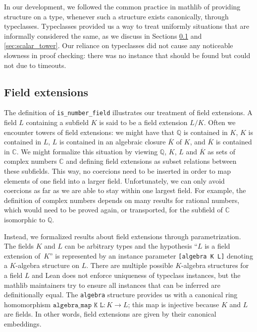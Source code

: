 \documentclass[sn-mathphys]{sn-jnl}%
\renewcommand{\C}{\mathbb{C}}
\newcommand{\lean}[1]{\texttt{#1}\xspace}
\newcommand{\mathlib}{\textsf{mathlib}\xspace}
\newcommand{\QQ}{\mathbb{Q}}
\begin{document}
In our development, we followed the common practice in \mathlib of providing structure on a type,
whenever such a structure exists canonically, through typeclasses.
Typeclasses provided us a way to treat uniformly situations that are informally considered the same, as we discuss in Sections \ref{sec:field_extension} and \ref{sec:scalar_tower}.
Our reliance on typeclasses did not cause any noticeable slowness in proof checking:
there was no instance that should be found but could not due to timeouts.

\subsection{Field extensions} \label{sec:field_extension}

The definition of \lean{is\_number\_field} illustrates our treatment of field extensions.
A field $L$ containing a subfield $K$ is said to be a field extension $L / K$.
Often we encounter towers of field extensions: we might have that $\QQ$ is contained in $K$, $K$ is contained in $L$, $L$ is contained in an algebraic closure $\overline{K}$ of $K$, and $\overline{K}$ is contained in $\C$.
We might formalize this situation by viewing $\QQ$, $K$, $L$ and $\overline{K}$ as sets of complex numbers $\C$ and defining field extensions as subset relations between these subfields.
This way, no coercions need to be inserted in order to map elements of one field into a larger field.
Unfortunately, we can only avoid coercions as far as we are able to stay within one largest field.
For example, the definition of complex numbers depends on many results for rational numbers, which would need to be proved again, or transported, for the subfield of $\C$ isomorphic to $\QQ$.

Instead, we formalized results about field extensions through parametrization. The fields $K$ and $L$ can be arbitrary types
and the hypothesis ``$L$ is a field extension of~$K$'' is represented by an instance parameter \lean{[algebra K L]} denoting a $K$-algebra structure on $L$.
There are multiple possible $K$-algebra structures for a field $L$ and Lean does not enforce uniqueness of typeclass instances,
but the \mathlib maintainers try to ensure all instances that can be inferred are definitionally equal.
The \lean{algebra} structure provides us with a canonical ring homomorphism $\lean{algebra\_map K L} : K \to L$; this map is injective because $K$ and $L$ are fields.
In other words, field extensions are given by their canonical embeddings.
\end{document}
